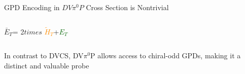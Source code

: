 \documentclass[aspectratio=169]{beamer}
\newcommand{\GPDET}{\textcolor{darkgreen}{$E_T$}}
\newcommand{\GPDHTtilde}{\textcolor{darkorange}{$\tilde{H}_T$}}
\newcommand{\GPDETbar}{\textcolor{mypurp}{$\bar{E}_T$}}
\begin{document}
\begin{frame}{GPD Encoding in  $DV\pi^0P$ Cross Section is Nontrivial}
\begin{columns}
            
                    
                \vspace{0.1cm}
                \footnotesize{\GPDETbar = 2$times$ \GPDHTtilde+\GPDET\\}
            
        \end{columns}
    
    \vspace{0.2cm}
    
    
     \begin{columns}
            \centering
            In contrast to DVCS, DV$\pi^0$P allows access to chiral-odd GPDs, making it a distinct and valuable probe
               
    \end{columns}
               
               \vspace{0.1cm}



\end{frame}
\end{document}
